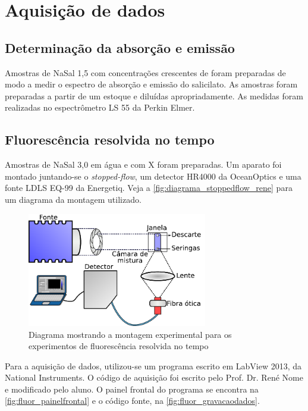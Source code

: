 		\section{Aquisição de dados}
			\subsection{Determinação da absorção e emissão}
			
			Amostras de NaSal 1,5\mM{} com concentrações crescentes de \TTAB{} foram preparadas de modo a medir o espectro de absorção e emissão do salicilato. As amostras foram preparadas a partir de um estoque e diluídas apropriadamente. As medidas foram realizadas no espectrômetro LS 55 da Perkin Elmer.
			
			\subsection{Fluorescência resolvida no tempo}
			\label{sec:experimental_fluor_resolvida}

			Amostras de NaSal 3,0\mM{} em água e com \TTAB X\mM{} foram preparadas. Um aparato foi montado juntando-se o \emph{stopped-flow}, um detector HR4000 da OceanOptics e uma fonte LDLS EQ-99 da Energetiq. Veja a \autoref{fig:diagrama_stoppedflow_rene} para um diagrama da montagem utilizado.
			
			\begin{figure}[h]
				\centering
				\includegraphics[width=0.7\textwidth]{imagens/fluor/diagrama_stopped_flow_rene}
				\caption{Diagrama mostrando a montagem experimental para os experimentos de fluorescência resolvida no tempo}
				\label{fig:diagrama_stoppedflow_rene}
			\end{figure}
			
			Para a aquisição de dados, utilizou-se um programa escrito em LabView 2013, da National Instruments. O código de aquisição foi escrito pelo Prof. Dr. René Nome e modificado pelo aluno. O painel frontal do programa se encontra na \autoref{fig:fluor_painelfrontal} e o código fonte, na \autoref{fig:fluor_gravacaodados}.
			
